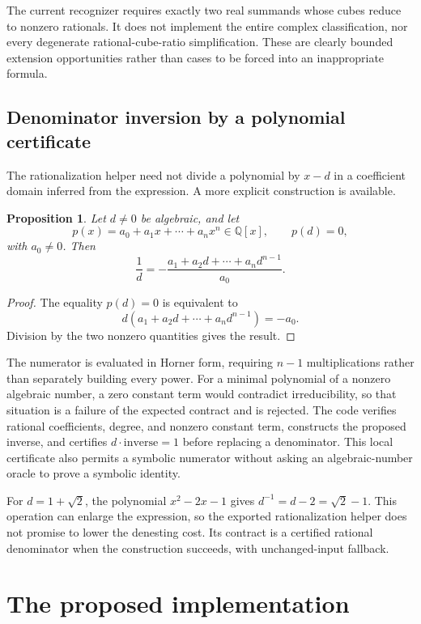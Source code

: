 \documentclass[11pt,letterpaper]{article}
\newcommand{\Q}{\mathbb{Q}}
\newtheorem{proposition}[theorem]{Proposition}
\theoremstyle{definition}
\theoremstyle{remark}
\begin{document}
The current recognizer requires exactly two real summands whose cubes reduce to nonzero rationals. It does not implement the entire complex classification, nor every degenerate rational-cube-ratio simplification. These are clearly bounded extension opportunities rather than cases to be forced into an inappropriate formula.

\subsection{Denominator inversion by a polynomial certificate}\label{sec:inverse}

The rationalization helper need not divide a polynomial by $x-d$ in a coefficient domain inferred from the expression. A more explicit construction is available.

\begin{proposition}\label{prop:inverse}
Let $d\ne0$ be algebraic, and let
\[
 p(x)=a_0+a_1x+\cdots+a_nx^n\in\Q[x],\qquad p(d)=0,
\]
with $a_0\ne0$. Then
\begin{equation}\label{eq:inverse}
 \frac1d=-\frac{a_1+a_2d+\cdots+a_nd^{n-1}}{a_0}.
\end{equation}
\end{proposition}
\begin{proof}
The equality $p(d)=0$ is equivalent to
\[
 d(a_1+a_2d+\cdots+a_nd^{n-1})=-a_0.
\]
Division by the two nonzero quantities gives the result.
\end{proof}

The numerator is evaluated in Horner form, requiring $n-1$ multiplications rather than separately building every power. For a minimal polynomial of a nonzero algebraic number, a zero constant term would contradict irreducibility, so that situation is a failure of the expected contract and is rejected. The code verifies rational coefficients, degree, and nonzero constant term, constructs the proposed inverse, and certifies $d\cdot\text{inverse}=1$ before replacing a denominator. This local certificate also permits a symbolic numerator without asking an algebraic-number oracle to prove a symbolic identity.

For $d=1+\sqrt2$, the polynomial $x^2-2x-1$ gives $d^{-1}=d-2=\sqrt2-1$. This operation can enlarge the expression, so the exported rationalization helper does not promise to lower the denesting cost. Its contract is a certified rational denominator when the construction succeeds, with unchanged-input fallback.

\section{The proposed implementation}
\label{sec:implementation}
\end{document}
